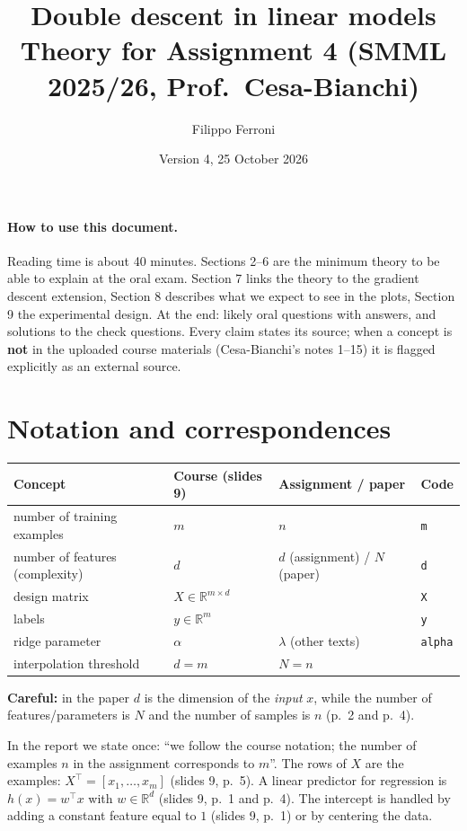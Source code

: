 \documentclass[11pt,a4paper]{article}
\title{Double descent in linear models\\\large Theory for Assignment 4 (SMML 2025/26, Prof.\ Cesa-Bianchi)}
\author{Filippo Ferroni}
\date{Version 4, 25 October 2026}
\newcommand{\R}{\mathbb{R}}
\begin{document}
\maketitle

\paragraph{How to use this document.}
Reading time is about 40 minutes. Sections 2--6 are the minimum theory to be able to explain at the oral exam.
Section 7 links the theory to the gradient descent extension, Section 8 describes what we expect to see in the plots,
Section 9 the experimental design. At the end: likely oral questions with answers, and solutions to the check questions.
Every claim states its source; when a concept is \textbf{not} in the uploaded course materials (Cesa-Bianchi's notes 1--15) it is
flagged explicitly as an external source.

\tableofcontents

\section{Notation and correspondences}

\begin{center}
\begin{tabular}{@{}llll@{}}
\toprule
Concept & Course (slides 9) & Assignment / paper & Code \\
\midrule
number of training examples & $m$ & $n$ & \texttt{m} \\
number of features (complexity) & $d$ & $d$ (assignment) / $N$ (paper) & \texttt{d} \\
design matrix & $X \in \R^{m\times d}$ & & \texttt{X} \\
labels & $y \in \R^m$ & & \texttt{y} \\
ridge parameter & $\alpha$ & $\lambda$ (other texts) & \texttt{alpha} \\
interpolation threshold & $d = m$ & $N = n$ & \\
\bottomrule
\end{tabular}
\end{center}

\textbf{Careful:} in the paper $d$ is the dimension of the \emph{input} $x$, while the number of features/parameters is $N$ and the number of samples is $n$ (p.~2 and p.~4).

In the report we state once: ``we follow the course notation; the number of examples $n$ in the assignment corresponds
to $m$''. The rows of $X$ are the examples: $X^\top = [x_1,\dots,x_m]$ (slides 9, p.~5).
A linear predictor for regression is $h(x) = w^\top x$ with $w \in \R^d$ (slides 9, p.~1 and p.~4).
The intercept is handled by adding a constant feature equal to $1$ (slides 9, p.~1) or by centering the data.
\end{document}
